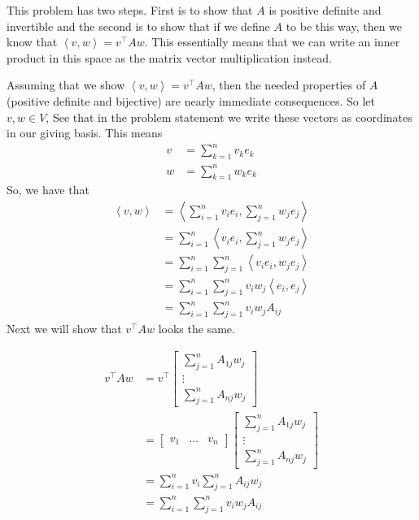 \documentclass[answers]{exam}
\newcommand{\ip}[1]{\left\langle#1\right\rangle}
\begin{document}
\begin{questions}
\begin{parts}
\begin{solution}
            This problem has two steps. First is to show that $A$ is positive definite and invertible and the
            second is to show that if we define $A$ to be this way, then we know that $\ip{v,w}=v^\top Aw$.
            This essentially means that we can write an inner product in this space as the matrix vector 
            multiplication instead.

            Assuming that we show $\ip{v,w} = v^\top Aw$, then the needed properties of $A$ (positive definite
            and bijective) are nearly immediate consequences. So let $v,w\in V$, See that in the problem statement
            we write these vectors as coordinates in our giving basis. This means
            \begin{align*}
                v &= \sum_{k=1}^n v_ke_k \\
                w &= \sum_{k=1}^n w_ke_k
            \end{align*}
            So, we have that 
            \begin{align*}
                \ip{v,w} &= \ip{\sum_{i=1}^n v_ie_i,\sum_{j=1}^n w_je_j} \\
                &= \sum_{i=1}^n\ip{v_ie_i,\sum_{j=1}^n w_je_j} \\
                &= \sum_{i=1}^n\sum_{j=1}^n\ip{v_ie_i,w_je_j} \\
                &= \sum_{i=1}^n\sum_{j=1}^nv_iw_j\ip{e_i,e_j} \\
                &= \sum_{i=1}^n\sum_{j=1}^nv_iw_jA_{ij}
            \end{align*}
            Next we will show that $v^\top Aw$ looks the same.

            \begin{align*}
                v^\top Aw &= v^\top \begin{bmatrix}
                    \sum_{j=1}^nA_{1j}w_j \\
                    \vdots \\
                    \sum_{j=1}^nA_{nj}w_j 
                \end{bmatrix} \\
                &= \begin{bmatrix} v_1 & \dots & v_n \end{bmatrix}\begin{bmatrix}
                    \sum_{j=1}^nA_{1j}w_j \\
                    \vdots \\
                    \sum_{j=1}^nA_{nj}w_j 
                \end{bmatrix} \\
                &= \sum_{i=1}^n v_i\sum_{j=1}^n A_{ij}w_j \\
                &= \sum_{i=1}^n \sum_{j=1}^n v_iw_j A_{ij}
            \end{align*}


\end{solution}
\end{parts}
\end{questions}
\end{document}
